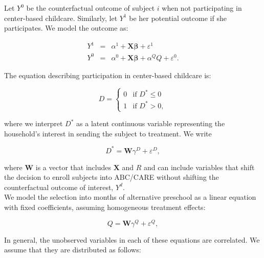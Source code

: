 \noindent Let $Y^{0}$ be the counterfactual outcome of subject $i$ when not participating in center-based childcare. Similarly, let $Y^{1}$ be her potential outcome if she participates. We model the outcome as:

\begin{eqnarray}
Y^1 &=& \alpha^1+\mathbf{X} \mathbf{\beta}                 +\varepsilon^1 \nonumber  \\
Y^0 &=& \alpha^0+\mathbf{X} \mathbf{\beta} + \alpha^Q Q+\varepsilon^0.  \label{eq:potout}
\end{eqnarray}

\noindent The equation describing participation in center-based childcare is:

\begin{equation}
D = \left\{
        \begin{array}{ll}
        	0 &\text{if } D^* \leq  0 \\
            1 &\text{if } D^* > 0, \label{eq:sel1}
        \end{array}
    \right.
\end{equation}

\noindent where we interpret $D^*$ as a latent continuous variable representing the household's interest in sending the subject to treatment. We write

\begin{equation}
D^{*} = \mathbf{W} \gamma^{D} + \varepsilon^{D}, \label{eq:probitD}
\end{equation}

\noindent where $\mathbf{W}$ is a vector that includes $\mathbf{X}$ and $R$ and can include variables that shift the decision to enroll subjects into ABC/CARE without shifting the counterfactual outcome of interest, $Y^{d}$. \\

\noindent We model the selection into months of alternative preschool as a linear equation with fixed coefficients, assuming homogeneous treatment effects:

\begin{equation}
Q = \mathbf{W} \gamma^{Q} + \varepsilon^{Q}, \label{eq:selq}
\end{equation}

\noindent In general, the unobserved variables in each of these equations are correlated. We assume that they are distributed as follows:

